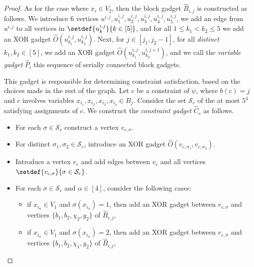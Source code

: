 \begin{proof}
        As for the case where $x_i \in V_2$, then the block gadget $\hat{B}_{i,j}$
        is constructed as follows.
        We introduce $6$ vertices $u^{i,j}, u^{i,j}_1, u^{i,j}_2, u^{i,j}_3, u^{i,j}_4, u^{i,j}_5$,
        we add an edge from $u^{i,j}$ to all vertices in $\setdef{u^{i,j}_k}{k \in [5]}$,
        and for all $1 \le k_1 < k_2 \le 5$ we add an XOR gadget
        $\hat{O}(u^{i,j}_{k_1},u^{i,j}_{k_2})$.
        Next, for $j \in [j_1,j_2-1]$, for all \emph{distinct} $k_1,k_2 \in [5]$,
        we add an XOR gadget $\hat{O}(u^{i,j}_{k_1},u^{i,j+1}_{k_2})$,
        and we call the \emph{variable gadget} $\hat{P}_i$ this sequence of serially connected block gadgets.



        This gadget is responsible for determining constraint satisfaction,
        based on the choices made in the rest of the graph.
        Let $c$ be a constraint of $\psi$, where $b(c) = j$ and
        $c$ involves variables $x_{i_1},x_{i_2},x_{i_3}, x_{i_4} \in B_j$.
        Consider the set $\mathcal{S}_c$ of the at most $5^4$ satisfying assignments of $c$.
        We construct the \emph{constraint gadget} $\hat{C}_c$ as follows.
        \begin{itemize}
            \item For each $\sigma \in \mathcal{S}_c$ construct a vertex $v_{c,\sigma}$.

            \item For distinct $\sigma_1,\sigma_2 \in \mathcal{S}_c$,
            introduce an XOR gadget $\hat{O}(v_{c,\sigma_1},v_{c,\sigma_2})$.

            \item Introduce a vertex $v_c$ and add edges between $v_c$ and all vertices $\setdef{v_{c,\sigma}}{\sigma \in \mathcal{S}_c}$.

            \item For each $\sigma \in \mathcal{S}_c$ and $\alpha \in [4]$,
            consider the following cases:
            \begin{itemize}
                \item if $x_{i_\alpha} \in V_1$ and $\sigma(x_{i_\alpha}) = 1$,
                then add an XOR gadget between $v_{c,\sigma}$ and vertices $\{b_1, b_2, \chi_2, y_2\}$ of $\hat{B}_{i,j}$,

                \item if $x_{i_\alpha} \in V_1$ and $\sigma(x_{i_\alpha}) = 2$,
                then add an XOR gadget between $v_{c,\sigma}$ and vertices $\{b_1, b_2, \chi_1, y_2\}$ of $\hat{B}_{i,j}$,


\end{itemize}
\end{itemize}
\end{proof}
